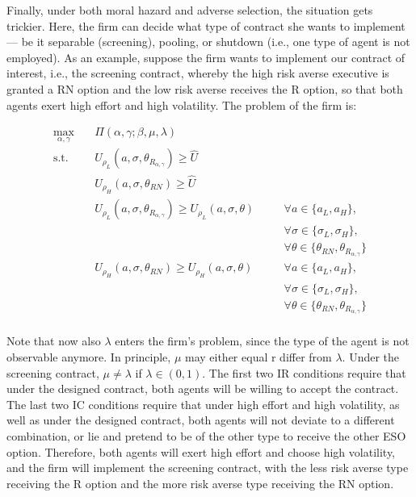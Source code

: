 Finally, under both moral hazard and adverse selection, the situation gets trickier. Here, the firm can decide what type of contract she wants to implement --- be it separable (screening), pooling, or shutdown (i.e., one type of agent is not employed). As an example, suppose the firm wants to implement our contract of interest, i.e., the screening contract, whereby the high risk averse executive is granted a RN option and the low risk averse receives the R option, so that both agents exert high effort and high volatility. The problem of the firm is:

\begin{equation}
    \label{eqn:pbl_bestIII_screening}
    \begin{alignedat}{2}
        \max_{\alpha, \gamma} \quad & \Pi (\alpha, \gamma; \beta, \mu, \lambda) \\
        \textrm{s.t.}       \quad & U_{\rho_L}(a, \sigma, \theta_{R_{\alpha, \gamma}}) \ge \hat{U} \\
                            \quad & U_{\rho_H}(a, \sigma, \theta_{RN}) \ge \hat{U} \\
                            \quad & U_{\rho_L}(a, \sigma, \theta_{R_{\alpha, \gamma}}) \ge U_{\rho_L}(a, \sigma, \theta) &\quad& \forall a \in \{ a_L, a_H \}, \\
                            \quad & &\quad& \forall \sigma \in \{ \sigma_L, \sigma_H \}, \\
                            \quad & &\quad& \forall \theta \in \{ \theta_{RN}, \theta_{R_{\alpha, \gamma}} \} \\ 
                            \quad & U_{\rho_H}(a, \sigma, \theta_{RN}) \ge U_{\rho_H}(a, \sigma, \theta) &\quad& \forall a \in \{ a_L, a_H \}, \\
                            \quad & &\quad& \forall \sigma \in \{ \sigma_L, \sigma_H \}, \\
                            \quad & &\quad& \forall \theta \in \{ \theta_{RN}, \theta_{R_{\alpha, \gamma}} \} \\ 
    \end{alignedat}
    \end{equation}



Note that now also $\lambda$ enters the firm's problem, since the type of the agent is not observable anymore. In principle, $\mu$ may either equal r differ from $\lambda$. Under the screening contract, $\mu \neq \lambda$ if $\lambda \in (0,1)$.
The first two IR conditions require that under the designed contract, both agents will be willing to accept the contract. The last two IC conditions require that under high effort and high volatility, as well as under the designed contract, both agents will not deviate to a different combination, or lie and pretend to be of the other type to receive the other ESO option. Therefore, both agents will exert high effort and choose high volatility, and the firm will implement the screening contract, with the less risk averse type receiving the R option and the more risk averse type receiving the RN option.

